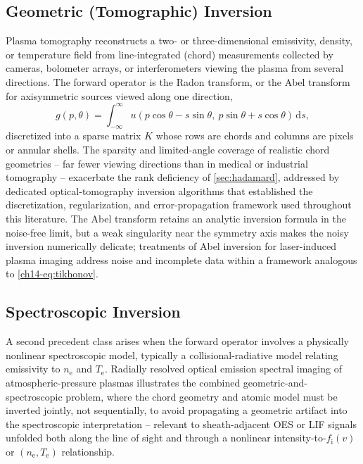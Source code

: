 \subsection{Geometric (Tomographic) Inversion}

Plasma tomography reconstructs a two- or three-dimensional emissivity, density, or temperature field from line-integrated (chord) measurements collected by cameras, bolometer arrays, or interferometers viewing the plasma from several directions. The forward operator is the Radon transform, or the Abel transform for axisymmetric sources viewed along one direction,
\begin{equation}
g(p, \theta) = \int_{-\infty}^{\infty} u(p\cos\theta - s\sin\theta,\ p\sin\theta + s\cos\theta)\, \mathrm{d}s,
\label{eq:radon}
\end{equation}
discretized into a sparse matrix $K$ whose rows are chords and columns are pixels or annular shells. The sparsity and limited-angle coverage of realistic chord geometries -- far fewer viewing directions than in medical or industrial tomography -- exacerbate the rank deficiency of \cref{sec:hadamard}, addressed by dedicated optical-tomography inversion algorithms that established the discretization, regularization, and error-propagation framework used throughout this literature. The Abel transform retains an analytic inversion formula in the noise-free limit, but a weak singularity near the symmetry axis makes the noisy inversion numerically delicate; treatments of Abel inversion for laser-induced plasma imaging address noise and incomplete data within a framework analogous to \cref{ch14-eq:tikhonov}.

\subsection{Spectroscopic Inversion}

A second precedent class arises when the forward operator involves a physically nonlinear spectroscopic model, typically a collisional-radiative model relating emissivity to $n_{\mathrm{e}}$ and $T_{\mathrm{e}}$. Radially resolved optical emission spectral imaging of atmospheric-pressure plasmas illustrates the combined geometric-and-spectroscopic problem, where the chord geometry and atomic model must be inverted jointly, not sequentially, to avoid propagating a geometric artifact into the spectroscopic interpretation -- relevant to sheath-adjacent OES or LIF signals unfolded both along the line of sight and through a nonlinear intensity-to-$f_{\mathrm{i}}(v)$ or $(n_{\mathrm{e}}, T_{\mathrm{e}})$ relationship.

